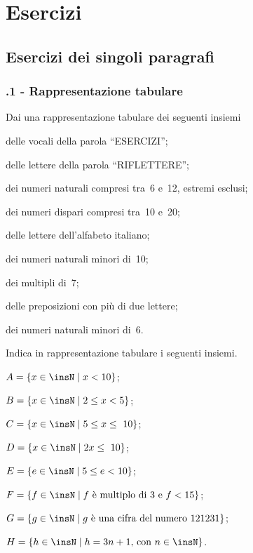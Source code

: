 \section{Esercizi}
\subsection{Esercizi dei singoli paragrafi}
\subsubsection*{\thechapter.1 - Rappresentazione tabulare}

\begin{esercizio}
\label{ese:6.1}
Dai una rappresentazione tabulare dei seguenti insiemi
\begin{enumeratea}
 \item delle vocali della parola ``ESERCIZI'';
 \item delle lettere della parola ``RIFLETTERE'';
 \item dei numeri naturali compresi tra~6 e~12, estremi esclusi;
 \item dei numeri dispari compresi tra~10 e~20;
 \item delle lettere dell'alfabeto italiano;
 \item dei numeri naturali minori di~10;
 \item dei multipli di~7;
 \item delle preposizioni con più di due lettere;
 \item dei numeri naturali minori di~6.
\end{enumeratea}
\end{esercizio}

\begin{esercizio}
 \label{ese:6.2}
Indica in rappresentazione tabulare i seguenti insiemi.
\TabPositions{7.5cm}
\begin{enumeratea}
 \item $A=\{x\in\insN\mid x<10\}$; %
 \item $B=\{x\in\insN\mid 2\le x<5\}$; %
 \item $C=\{x\in\insN\mid 5\le x\le~10\}$; %
 \item $D=\{x\in\insN\mid 2x\le~10\}$; %
 \item $E=\{e\in\insN\mid 5\le e<10\}$; %
 \item $F=\{f\in\insN\mid f\text{ è multiplo di~3 e } f<15\}$; %
 \item $G=\{g\in\insN\mid g\text{ è una cifra del numero }121231\}$; %
 \item $H=\{h\in\insN\mid h=3n+1\text{, con }n\in\insN\}$. %
\end{enumeratea}
\end{esercizio}

